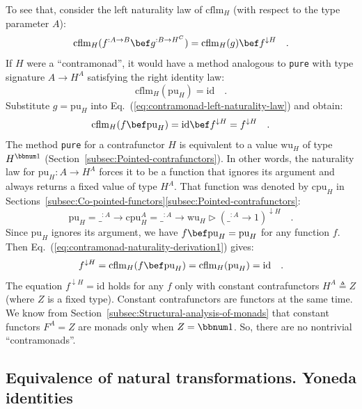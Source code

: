 To see that, consider the left naturality law of $\text{cflm}_{H}$
(with respect to the type parameter $A$):
\begin{equation}
\text{cflm}_{H}(f^{:A\rightarrow B}\bef g^{:B\rightarrow H^{C}})=\text{cflm}_{H}(g)\bef f^{\downarrow H}\quad.\label{eq:contramonad-left-naturality-law}
\end{equation}
If $H$ were a \textsf{``}contramonad\textsf{''}, it would have a method analogous
to \lstinline!pure! with type signature $A\rightarrow H^{A}$ satisfying
the right identity law:
\[
\text{cflm}_{H}(\text{pu}_{H})=\text{id}\quad.
\]
Substitute $g=\text{pu}_{H}$ into Eq.~(\ref{eq:contramonad-left-naturality-law})
and obtain:
\begin{equation}
\text{cflm}_{H}(f\bef\text{pu}_{H})=\text{id}\bef f^{\downarrow H}=f^{\downarrow H}\quad.\label{eq:contramonad-naturality-derivation1}
\end{equation}
The method \lstinline!pure! for a contrafunctor $H$ is equivalent
to a value $\text{wu}_{H}$ of type $H^{\bbnum 1}$ (Section~\ref{subsec:Pointed-contrafunctors}).
In other words, the naturality law for $\text{pu}_{H}:A\rightarrow H^{A}$
forces it to be a function that ignores its argument and always returns
a fixed value of type $H^{A}$. That function was denoted by $\text{cpu}_{H}$
in Sections~\ref{subsec:Co-pointed-functors}\textendash \ref{subsec:Pointed-contrafunctors}:
\[
\text{pu}_{H}=\_^{:A}\rightarrow\text{cpu}_{H}^{A}=\_^{:A}\rightarrow\text{wu}_{H}\triangleright(\_^{:A}\rightarrow1)^{\downarrow H}\quad.
\]
Since $\text{pu}_{H}$ ignores its argument, we have $f\bef\text{pu}_{H}=\text{pu}_{H}$
for any function $f$. Then Eq.~(\ref{eq:contramonad-naturality-derivation1})
gives:
\[
f^{\downarrow H}=\text{cflm}_{H}(f\bef\text{pu}_{H})=\text{cflm}_{H}(\text{pu}_{H})=\text{id}\quad.
\]
The equation $f^{\downarrow H}=\text{id}$ holds for any $f$ only
with constant contrafunctors $H^{A}\triangleq Z$ (where $Z$ is a
fixed type). Constant contrafunctors are functors at the same time.
We know from Section~\ref{subsec:Structural-analysis-of-monads}
that constant functors $F^{A}=Z$ are monads only when $Z=\bbnum 1$.
So, there are no nontrivial \textsf{``}contramonads\textsf{''}. 

\subsection{Equivalence of natural transformations. Yoneda identities\label{subsec:Yoneda-identities}}

